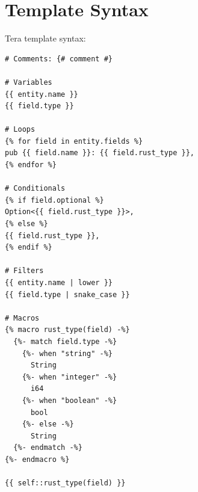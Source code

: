 \section{Template Syntax}

Tera template syntax:

\begin{verbatim}
# Comments: {# comment #}

# Variables
{{ entity.name }}
{{ field.type }}

# Loops
{% for field in entity.fields %}
pub {{ field.name }}: {{ field.rust_type }},
{% endfor %}

# Conditionals
{% if field.optional %}
Option<{{ field.rust_type }}>,
{% else %}
{{ field.rust_type }},
{% endif %}

# Filters
{{ entity.name | lower }}
{{ field.type | snake_case }}

# Macros
{% macro rust_type(field) -%}
  {%- match field.type -%}
    {%- when "string" -%}
      String
    {%- when "integer" -%}
      i64
    {%- when "boolean" -%}
      bool
    {%- else -%}
      String
  {%- endmatch -%}
{%- endmacro %}

{{ self::rust_type(field) }}
\end{verbatim}
